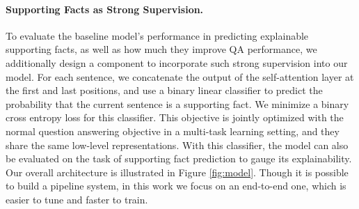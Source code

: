 



\paragraph{Supporting Facts as Strong Supervision.}
To evaluate the baseline model's performance in predicting explainable supporting facts, as well as how much they improve QA performance, we additionally design a component to incorporate such strong supervision into our model.
For each sentence, we concatenate the output of the self-attention layer at the first and last positions, and use a binary linear classifier to predict the probability that the current sentence is a supporting fact.
We minimize a binary cross entropy loss for this classifier.
This %
objective is jointly optimized with the normal question answering objective in a multi-task learning setting, and they share the same low-level representations.
With this classifier, the model can also be evaluated on the task of supporting fact prediction to gauge its explainability.
Our overall architecture is illustrated in Figure \ref{fig:model}.
Though it is possible to build a pipeline system, in this work we focus on an end-to-end one, which is easier to tune and faster to train.


